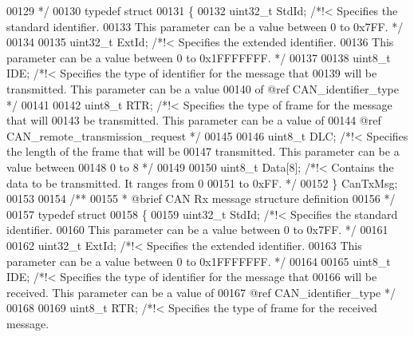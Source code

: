 \begin{DoxyCode}
00129 \textcolor{comment}{  */}
00130 \textcolor{keyword}{typedef} \textcolor{keyword}{struct}
00131 \{
00132   uint32\_t StdId;  \textcolor{comment}{/*!< Specifies the standard identifier.}
00133 \textcolor{comment}{                        This parameter can be a value between 0 to 0x7FF. */}
00134 
00135   uint32\_t ExtId;  \textcolor{comment}{/*!< Specifies the extended identifier.}
00136 \textcolor{comment}{                        This parameter can be a value between 0 to 0x1FFFFFFF. */}
00137 
00138   uint8\_t IDE;     \textcolor{comment}{/*!< Specifies the type of identifier for the message that }
00139 \textcolor{comment}{                        will be transmitted. This parameter can be a value }
00140 \textcolor{comment}{                        of @ref CAN\_identifier\_type */}
00141 
00142   uint8\_t RTR;     \textcolor{comment}{/*!< Specifies the type of frame for the message that will }
00143 \textcolor{comment}{                        be transmitted. This parameter can be a value of }
00144 \textcolor{comment}{                        @ref CAN\_remote\_transmission\_request */}
00145 
00146   uint8\_t DLC;     \textcolor{comment}{/*!< Specifies the length of the frame that will be }
00147 \textcolor{comment}{                        transmitted. This parameter can be a value between }
00148 \textcolor{comment}{                        0 to 8 */}
00149 
00150   uint8\_t Data[8]; \textcolor{comment}{/*!< Contains the data to be transmitted. It ranges from 0 }
00151 \textcolor{comment}{                        to 0xFF. */}
00152 \} CanTxMsg;
00153 
00154 \textcolor{comment}{/** }
00155 \textcolor{comment}{  * @brief  CAN Rx message structure definition  }
00156 \textcolor{comment}{  */}
00157 \textcolor{keyword}{typedef} \textcolor{keyword}{struct}
00158 \{
00159   uint32\_t StdId;  \textcolor{comment}{/*!< Specifies the standard identifier.}
00160 \textcolor{comment}{                        This parameter can be a value between 0 to 0x7FF. */}
00161 
00162   uint32\_t ExtId;  \textcolor{comment}{/*!< Specifies the extended identifier.}
00163 \textcolor{comment}{                        This parameter can be a value between 0 to 0x1FFFFFFF. */}
00164 
00165   uint8\_t IDE;     \textcolor{comment}{/*!< Specifies the type of identifier for the message that }
00166 \textcolor{comment}{                        will be received. This parameter can be a value of }
00167 \textcolor{comment}{                        @ref CAN\_identifier\_type */}
00168 
00169   uint8\_t RTR;     \textcolor{comment}{/*!< Specifies the type of frame for the received message.}

\end{DoxyCode}
